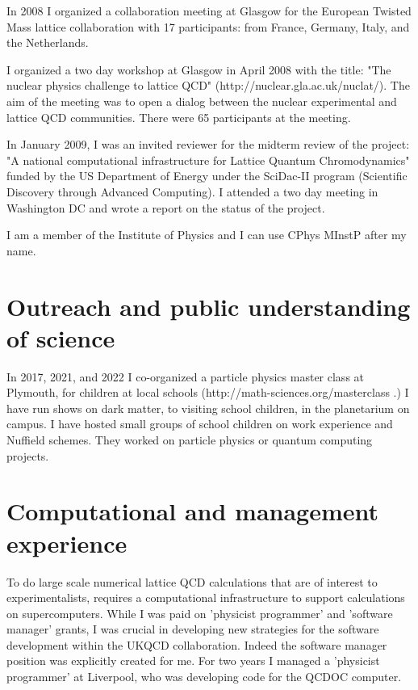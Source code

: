\documentclass[12pt]{article}
\begin{document}
In 2008 I organized a collaboration meeting at Glasgow for the
European Twisted Mass lattice collaboration with 17 participants: from
France, Germany, Italy, and the Netherlands.

I organized a two day workshop at Glasgow in April 2008 with the
title: "The nuclear physics challenge to lattice QCD"
(http://nuclear.gla.ac.uk/nuclat/). The aim of the meeting was to
open a dialog between the nuclear experimental and lattice
QCD communities. There were 65 participants at the meeting.

In January 2009, I was an invited reviewer for the midterm review of
the project: "A national computational infrastructure for Lattice
Quantum Chromodynamics" funded by the US Department of Energy 
under the SciDac-II program (Scientific Discovery 
through Advanced Computing).
I attended a two day meeting in Washington DC and wrote a report
on the status of the project.

I am a member of the Institute of Physics and I can use
CPhys MInstP after my name.

\section{Outreach and public understanding of science}

In 2017, 2021, and 2022 I co-organized a particle physics master 
class at Plymouth, for children at local schools  (http://math-sciences.org/masterclass .)
I have run shows on dark matter, to visiting school children,
in the planetarium on campus. I have hosted small groups
of school children on work experience and Nuffield 
schemes. They worked on particle physics or quantum computing
projects.


\section{Computational and management experience}

To do large scale numerical lattice QCD calculations that are of
interest to experimentalists, requires a computational infrastructure
to support calculations on supercomputers.  While I was paid on
'physicist programmer' and 'software manager' grants, I was crucial in
developing new strategies for the software development within the 
UKQCD collaboration.
Indeed the software manager position was explicitly created for me.
For two years I managed a 'physicist programmer' at Liverpool, who
was developing code for the QCDOC computer. 
\end{document}
